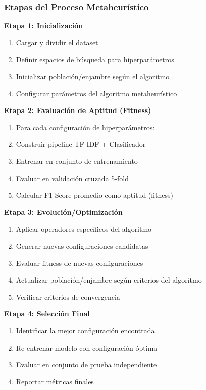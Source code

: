 \subsubsection{Etapas del Proceso Metaheurístico}

\textbf{Etapa 1: Inicialización}
\begin{enumerate}
    \item Cargar y dividir el dataset
    \item Definir espacios de búsqueda para hiperparámetros
    \item Inicializar población/enjambre según el algoritmo
    \item Configurar parámetros del algoritmo metaheurístico
\end{enumerate}

\textbf{Etapa 2: Evaluación de Aptitud (Fitness)}
\begin{enumerate}
    \item Para cada configuración de hiperparámetros:
    \item \quad Construir pipeline TF-IDF + Clasificador
    \item \quad Entrenar en conjunto de entrenamiento
    \item \quad Evaluar en validación cruzada 5-fold
    \item \quad Calcular F1-Score promedio como aptitud (fitness)
\end{enumerate}

\textbf{Etapa 3: Evolución/Optimización}
\begin{enumerate}
    \item Aplicar operadores específicos del algoritmo
    \item Generar nuevas configuraciones candidatas
    \item Evaluar fitness de nuevas configuraciones
    \item Actualizar población/enjambre según criterios del algoritmo
    \item Verificar criterios de convergencia
\end{enumerate}

\textbf{Etapa 4: Selección Final}
\begin{enumerate}
    \item Identificar la mejor configuración encontrada
    \item Re-entrenar modelo con configuración óptima
    \item Evaluar en conjunto de prueba independiente
    \item Reportar métricas finales
\end{enumerate}

